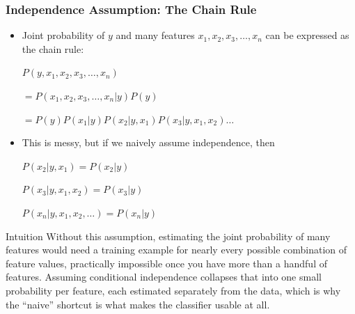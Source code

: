 \begin{frame}[fragile]\frametitle{Independence Assumption: The Chain Rule}
\begin{itemize}
\item Joint probability of $y$ and many features $x_1,x_2,x_3,\ldots,x_n$ can be expressed as the chain rule:

$P(y,x_1,x_2,x_3,\ldots,x_n)$

$= P(x_1,x_2,x_3,\ldots,x_n|y)P(y)$

$= P(y)P(x_1|y)P(x_2|y,x_1)P(x_3|y,x_1,x_2)\ldots$

\item This is messy, but if we naively assume independence, then

$P(x_2|y,x_1) = P(x_2|y)$

$P(x_3|y,x_1,x_2) = P(x_3|y)$

$P(x_n|y,x_1,x_2,\ldots) = P(x_n|y)$

\end{itemize}

\begin{block}{Intuition}
Without this assumption, estimating the joint probability of many features would need a
training example for nearly every possible combination of feature values, practically
impossible once you have more than a handful of features. Assuming conditional independence
collapses that into one small probability per feature, each estimated separately from the
data, which is why the ``naive'' shortcut is what makes the classifier usable at all.
\end{block}
\end{frame}

